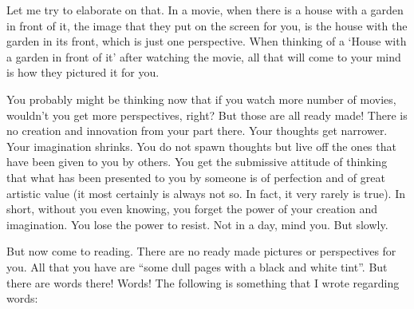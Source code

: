 \documentclass[twoside,11pt,titlepage]{article}
\begin{document}
Let me try to elaborate on that. In a movie, when there is a house with a garden in front of it, the image that they put on the screen for you, is the house with the garden in its front, which is just one perspective. When thinking of a `House with a garden in front of it' after watching the movie, all that will come to your mind is how they pictured it for you.

You probably might be thinking now that if you watch more number of movies, wouldn't you get more perspectives, right? But those are all ready made! There is no creation and innovation from your part there. Your thoughts get narrower. Your imagination shrinks. You do not spawn thoughts but live off the ones that have been given to you by others. You get the submissive attitude of thinking that what has been presented to you by someone is of perfection and of great artistic value (it most certainly is always not so. In fact, it very rarely is true). In short, without you even knowing, you forget the power of your creation and imagination. You lose the power to resist. Not in a day, mind you. But slowly.

But now come to reading. There are no ready made pictures or perspectives for you. All that you have are ``some dull pages with a black and white tint''. But there are words there! Words! The following is something that I wrote regarding words:
\end{document}
